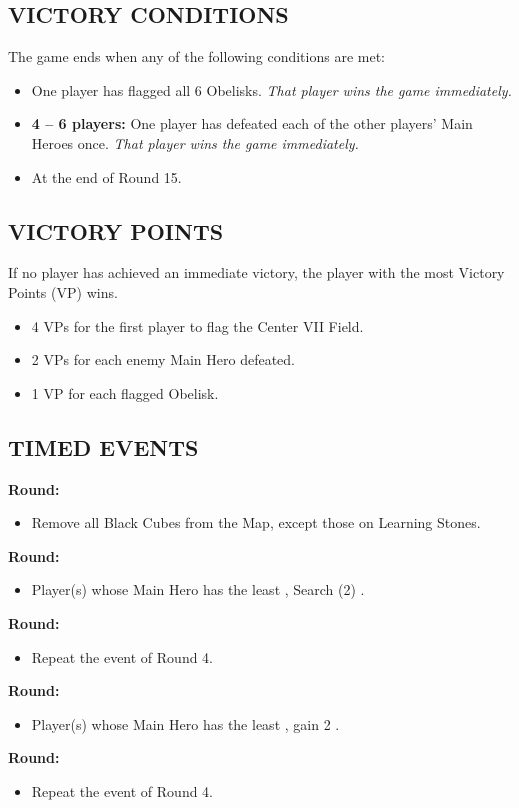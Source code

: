 \begin{multicols*}{2}
\subsection*{\MakeUppercase{Victory Conditions}}
The game ends when any of the following conditions are met:

\begin{itemize}
  \item One player has flagged all 6 Obelisks. \textit{That player wins the game immediately.}
  \item \textbf{4 -- 6 players:} One player has defeated each of the other players' Main Heroes once. \textit{That player wins the game immediately.}
  \item At the end of Round 15.
\end{itemize}

\subsection*{\MakeUppercase{Victory Points}}
If no player has achieved an immediate victory, the player with the most Victory Points (VP) wins.

\begin{itemize}
  \item 4 VPs for the first player to flag the Center VII Field.
  \item 2 VPs for each enemy Main Hero defeated.
  \item 1 VP for each flagged Obelisk.
\end{itemize}

\subsection*{\MakeUppercase{Timed Events}}
\textbf{ Round:}
\begin{itemize}
  \item Remove all Black Cubes from the Map, except those on Learning Stones.
\end{itemize}
\textbf{ Round:}
\begin{itemize}
  \item Player(s) whose Main Hero has the least , Search (2) .
\end{itemize}
\textbf{ Round:}
\begin{itemize}
  \item Repeat the event of Round 4.
\end{itemize}
\textbf{ Round:}
\begin{itemize}
  \item Player(s) whose Main Hero has the least , gain 2 .
\end{itemize}
\textbf{ Round:}
\begin{itemize}
  \item Repeat the event of Round 4.
\end{itemize}


\end{multicols*}
